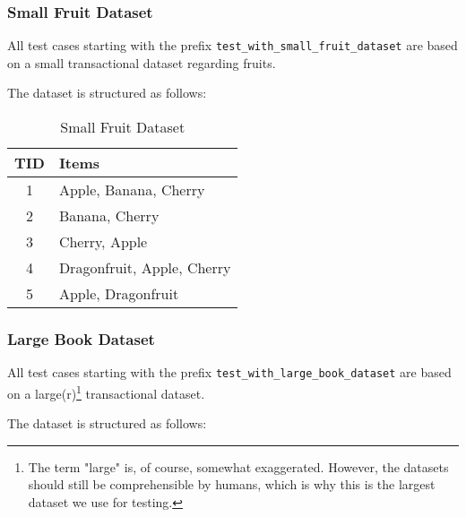 \documentclass[
english,
smallborders
]{i6prcsht}
\begin{document}
\subsubsection*{Small Fruit Dataset}

All test cases starting with the prefix \texttt{test\_with\_small\_fruit\_dataset} are based on a small transactional dataset regarding fruits.

The dataset is structured as follows:

\vspace*{0.7cm}

\begin{table}[ht]
	\centering
	\begin{tabular}{|c|l|}
		\hline
		\textbf{TID} & \textbf{Items}             \\
		\hline
		1            & Apple, Banana, Cherry      \\
		\hline
		2            & Banana, Cherry             \\
		\hline
		3            & Cherry, Apple              \\
		\hline
		4            & Dragonfruit, Apple, Cherry \\
		\hline
		5            & Apple, Dragonfruit         \\
		\hline
	\end{tabular}
	\caption{Small Fruit Dataset}
	\label{tab:small-fruit-dataset}
\end{table}

\vspace*{1cm}

\subsubsection*{Large Book Dataset}

All test cases starting with the prefix \texttt{test\_with\_large\_book\_dataset} are based on a large(r)\footnote{The term "large" is, of course, somewhat exaggerated. However, the datasets should still be comprehensible by humans, which is why this is the largest dataset we use for testing.} transactional dataset.

The dataset is structured as follows:

\vspace*{0.7cm}
\end{document}
